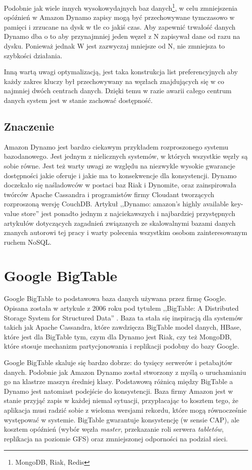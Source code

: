 Podobnie jak wiele innych wysokowydajnych baz danych\footnote{MongoDB, Riak, Redis}, w celu zmniejszenia opóźnień w Amazon Dynamo zapisy mogą być przechowywane tymczasowo w pamięci i zrzucane na dysk w tle co jakiś czas.
Aby zapewnić trwałość danych Dynamo dba o to aby przynajmniej jeden węzeł z N zapisywał dane od razu na dysku.
Ponieważ jednak W jest zazwyczaj mniejsze od N, nie zmniejsza to szybkości działania.

Inną wartą uwagi optymalizacją, jest taka konstrukcja list preferencyjnych aby każdy zakres kluczy był przechowywany na węzłach znajdujących się w co najmniej dwóch centrach danych.
Dzięki temu w razie awarii całego centrum danych system jest w stanie zachować dostępność.

\subsection*{Znaczenie}

Amazon Dynamo jest bardzo ciekawym przykładem rozproszonego systemu bazodanowego.
Jest jednym z nielicznych systemów, w których wszystkie węzły są sobie równe.
Jest też warty uwagi ze względu na niezwykle wysokie gwarancje dostępności jakie oferuje i jakie ma to konsekwencje dla konsystencji.
Dynamo doczekało się naśladowców w postaci baz Riak i Dynomite, oraz zainspirowała twórców Apache Cassandra i programistów firmy Cloudant tworzących rozproszoną wersję CouchDB.
Artykuł ,,Dynamo: amazon's highly available key-value store'' \cite{amazon-dynamo} jest ponadto jednym z najciekawszych i najbardziej przystępnych artykułów dotyczących zagadnień związanych ze skalowalnymi bazami danych znanych autorowi tej pracy i warty polecenia wszystkim osobom zainteresowanym ruchem NoSQL.

\section{Google BigTable}

Google BigTable to podstawowa baza danych używana przez firmę Google.
Opisana została w artykule z 2006 roku pod tytułem ,,BigTable: A Distributed Storage System for Structured Data'' \cite{google-bigtable}.
Baza ta stała się inspiracją dla systemów takich jak Apache Cassandra, które zawdzięcza BigTable model danych, HBase, które jest dla BigTable tym, czym dla Dynamo jest Riak, czy też MongoDB, które stosuje mechanizm partycjonowania i replikacji podobny do bazy Google.

Google BigTable skaluje się bardzo dobrze: do tysięcy serwerów i petabajtów danych.
Podobnie jak Amazon Dynamo został stworzony z myślą o uruchamianiu go na klastrze maszyn średniej klasy.
Podstawową różnicą między BigTable a Dynamo jest natomiast podejście do konsystencji.
Baza firmy Amazon jest w stanie przyjąć zapis w każdej niemal sytuacji, przypłacając to kosztem tego, że aplikacja musi radzić sobie z wieloma wersjami rekordu, które mogą równocześnie występować w systemie.
BigTable gwarantuje konsystencję (w sensie CAP), ale kosztem opóźnień (wybór węzła \emph{master}, przekazanie roli serwera \emph{tabletów}, replikacja na poziomie GFS) oraz zmniejszonej odporności na podział sieci.

